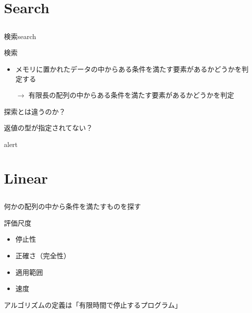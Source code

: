 \documentclass{beamer}
\begin{document}
\section{Search}		%
\subsection{}

\begin{frame}[fragile]{検索}{search}
\begin{block}{検索}
\begin{itemize}%
\item
メモリに置かれたデータの中からある条件を満たす要素があるかどうかを判定する
\item[$\to$]
有限長の配列の中からある条件を満たす要素があるかどうかを判定
\end{itemize}
\end{block}
探索とは違うのか？

返値の型が指定されてない？
\begin{alertblock}{alert}
\end{alertblock}
\end{frame}

\section{Linear}		%
\subsection{}

\begin{frame}[fragile]{何かの配列の中から条件を満たすものを探す}{}
\end{frame}

\begin{frame}[fragile]{評価尺度}{}
\begin{itemize}%
\item 停止性
\item 正確さ（完全性）
\item 適用範囲
\item 速度
\end{itemize}

\vfill
アルゴリズムの定義は「有限時間で停止するプログラム」
\end{frame}
\end{document}
